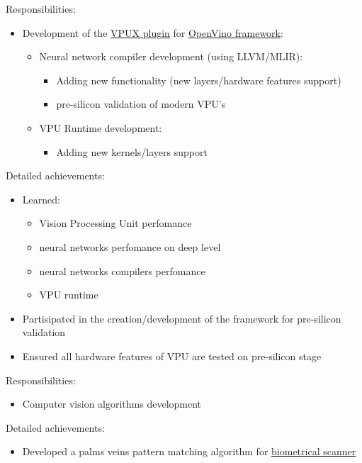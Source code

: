 \documentclass[a4paper,11pt]{memoir}
\begin{document}
{
Responsibilities:
\begin{itemize}
	\item Development of the \href{https://github.com/openvinotoolkit/vpux-plugin}{VPUX plugin} for \href{https://github.com/openvinotoolkit/openvino}{OpenVino framework}:
	\begin{itemize}
		\item Neural network compiler development (using LLVM/MLIR):
		\begin{itemize}
			\item Adding new functionality (new layers/hardware features support)
			\item pre-silicon validation of modern VPU's
		\end{itemize}
		\item VPU Runtime development:
		\begin{itemize}
			\item Adding new kernels/layers support
		\end{itemize}
	\end{itemize}	
\end{itemize}
Detailed achievements:
\begin{itemize}
	\item Learned:
	\begin{itemize} 
		\item Vision Processing Unit perfomance
		\item neural networks perfomance on deep level
		\item neural networks compilers perfomance
		\item VPU runtime
	\end{itemize}
	\item Partisipated in the creation/development of the framework for pre-silicon validation
	\item Ensured all hardware features of VPU are tested on pre-silicon stage
\end{itemize}
}

{
Responsibilities:
\begin{itemize}
	\item Computer vision algorithms development
\end{itemize}
Detailed achievements:
\begin{itemize}
	\item Developed a palms veins pattern matching algorithm for \href{https://en.kalashnikovgroup.ru/media/perspektivnye-razrabotki/kontsern-kalashnikov-predstavil-sobstvennyy-biometricheskiy-skaner}{biometrical \mbox{scanner}}
\end{itemize}
}
\end{document}
